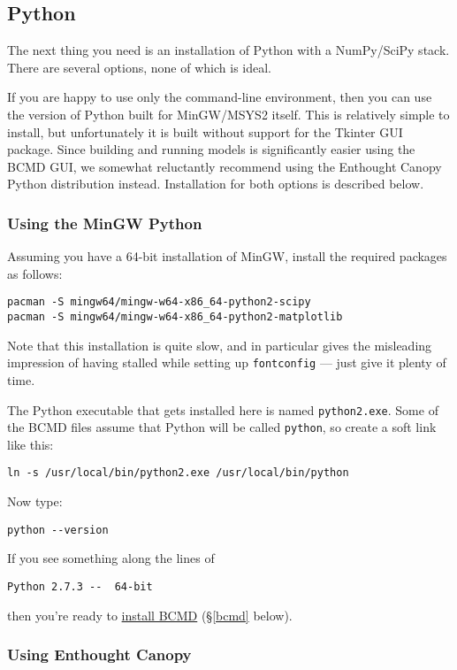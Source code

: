 \documentclass[a4paper,11pt]{article}
\begin{document}
\subsection{Python}

The next thing you need is an installation of Python with a NumPy/SciPy stack. There are several options, none of which is ideal.

If you are happy to use only the command-line environment, then you can use the version of Python built for MinGW/MSYS2 itself. This is relatively simple to install, but unfortunately it is built without support for the Tkinter GUI package. Since building and running models is significantly easier using the BCMD GUI, we somewhat reluctantly recommend using the Enthought Canopy Python distribution instead. Installation for both options is described below.

\subsubsection{Using the MinGW Python}

Assuming you have a 64-bit installation of MinGW, install the required packages as follows:
\begin{verbatim}
pacman -S mingw64/mingw-w64-x86_64-python2-scipy
pacman -S mingw64/mingw-w64-x86_64-python2-matplotlib
\end{verbatim}
Note that this installation is quite slow, and in particular gives the misleading impression of having stalled while setting up \texttt{fontconfig} --- just give it plenty of time.

The Python executable that gets installed here is named \texttt{python2.exe}. Some of the BCMD files assume that Python will be called \texttt{python}, so create a soft link like this:
\begin{verbatim}
ln -s /usr/local/bin/python2.exe /usr/local/bin/python
\end{verbatim}

Now type:
\begin{verbatim}python --version\end{verbatim}

If you see something along the lines of
\begin{verbatim}
Python 2.7.3 --  64-bit
\end{verbatim}
then you're ready to \hyperref[bcmd]{install BCMD} (\S\ref{bcmd} below).

\subsubsection{Using Enthought Canopy}
\end{document}
